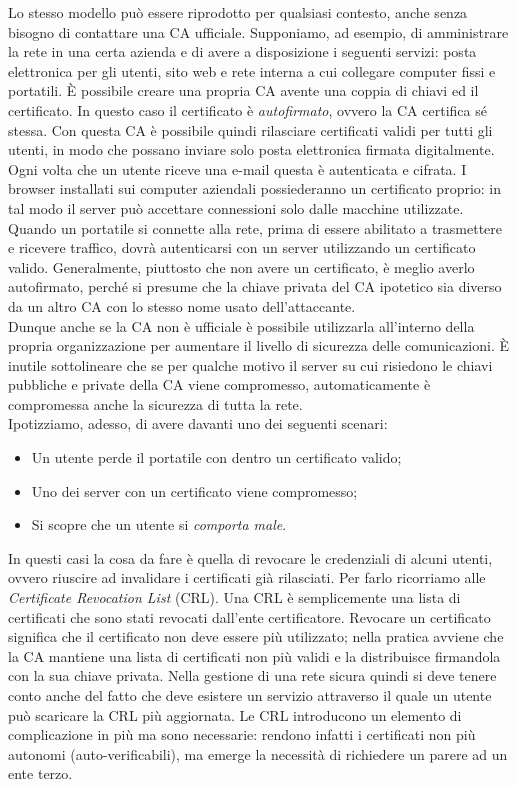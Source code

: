 Lo stesso modello può essere riprodotto per qualsiasi contesto, anche senza bisogno di contattare una CA ufficiale. Supponiamo, ad esempio, di amministrare la rete in una certa azienda e di avere a disposizione i seguenti servizi: posta elettronica per gli utenti, sito web e rete interna a cui collegare computer fissi e portatili. È possibile creare una propria CA avente una coppia di chiavi ed il certificato. In questo caso il certificato è \textit{autofirmato}, ovvero la CA certifica sé stessa. Con questa CA è possibile quindi rilasciare certificati validi per tutti gli utenti, in modo che possano inviare solo posta elettronica firmata digitalmente. Ogni volta che un utente riceve una e-mail questa è autenticata e cifrata. I browser installati sui computer aziendali possiederanno un certificato proprio: in tal modo il server può accettare connessioni solo dalle macchine utilizzate. Quando un portatile si connette alla rete, prima di essere abilitato a trasmettere e ricevere traffico, dovrà autenticarsi con un server utilizzando un certificato valido. Generalmente, piuttosto che non avere un certificato, è meglio averlo autofirmato, perché si presume che la chiave privata del CA ipotetico sia diverso da un altro CA con lo stesso nome usato dell'attaccante.\\
Dunque anche se la CA non è ufficiale è possibile utilizzarla all'interno della propria organizzazione per aumentare il livello di sicurezza delle comunicazioni. È inutile sottolineare che se per qualche motivo il server su cui risiedono le chiavi pubbliche e private della CA viene compromesso, automaticamente è compromessa anche la sicurezza di tutta la rete.\\
Ipotizziamo, adesso, di avere davanti uno dei seguenti scenari:
\begin{itemize}
	\item Un utente perde il portatile con dentro un certificato valido;
	\item Uno dei server con un certificato viene compromesso;
	\item Si scopre che un utente si \textit{comporta male}.
\end{itemize}
In questi casi la cosa da fare è quella di revocare le credenziali di alcuni utenti, ovvero riuscire ad invalidare i certificati già rilasciati. Per farlo ricorriamo alle \textit{Certificate Revocation List} (CRL). Una CRL è semplicemente una lista di certificati che sono stati revocati dall'ente certificatore. Revocare un certificato significa che il certificato non deve essere più utilizzato; nella pratica avviene che la CA mantiene una lista di certificati non più validi e la distribuisce firmandola con la sua chiave privata. Nella gestione di una rete sicura quindi si deve tenere conto anche del fatto che deve esistere un servizio attraverso il quale un utente può scaricare la CRL più aggiornata. Le CRL introducono un elemento di complicazione in più ma sono necessarie: rendono infatti i certificati non più autonomi (auto-verificabili), ma emerge la necessità di richiedere un parere ad un ente terzo.

